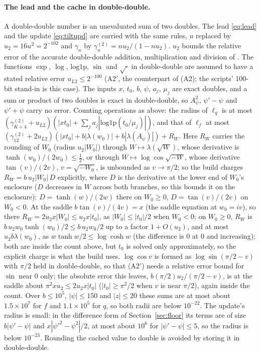 \paragraph{The lead and the cache in double-double.} A double-double number is an unevaluated sum of two doubles.
The lead \eqref{eq:lead} and the update \eqref{eq:tiltupd} are carried with the same rules, $u$ replaced by
$u_2=16u^2=2^{-102}$ and $\gamma_n$ by $\gamma^{(2)}_n=nu_2/(1-nu_2)$. $u_2$ bounds the relative error of the
accurate double-double addition, multiplication and division of \cite{jmp}. The functions $\exp$, $\log$,
$\mathrm{log1p}$, $\sin$ and $\sqrt{\cdot}$ in double-double are assumed to have a stated relative error
$u_{L2}\le2^{-100}$ (A2$'$, the counterpart of (A2); the scripts' 100-bit stand-in is this case). The inputs $x$,
$t_0$, $b$, $\psi$, $a_j$, $\mu_j$ are exact doubles, and a sum or product of two doubles is exact in
double-double, so $A_\psi^2$, $\psi'-\psi$ and $\psi'+\psi$ carry no error. Counting operations as above: the
radius of $\ell_q$ is at most $(\gamma^{(2)}_{K+4}+u_{L2})(|xt_0|+\sum_ja_j|\mathrm{log1p}(t_0/\mu_j)|)$, and that
of $\ell_f$ at most $(\gamma^{(2)}_{12}+2u_{L2})(|xt_0|+b|\lambda(w_0)|+b|\lambda(A_\psi)|)+R_W$. Here $R_W$ carries
the rounding of $W_0$ (radius $u_2|W_0|$) through $W\mapsto\lambda(\sqrt W)$, whose derivative is
$\tanh(w_0)/(2w_0)\le\frac12$, or through $W\mapsto\log\cos\sqrt{-W}$, whose derivative $\tan(v)/(2v)$, $v=\sqrt{-W_0}$,
is unbounded as $v\to\pi/2$; so the build charges $R_W=b\,u_2|W_0|\,D$ explicitly, where $D$ is the derivative
at the lower end of $W_0$'s enclosure ($D$ decreases in $W$ across both branches, so this bounds it on the
enclosure): $D=\tanh(w)/(2w)$ there on $W_0\ge0$, $D=\tan(v)/(2v)$ on $W_0<0$. At the saddle $b\tan(v)/(4v)=x$ (the
saddle equation at $w_0=iv$), so there $R_W=2u_2x|W_0|\le u_2x|t_0|$, as $|W_0|\le|t_0|/2$ when $W_0<0$; on
$W_0\ge0$, $R_W$ is $b\,u_2w_0\tanh(w_0)/2\le b\,u_2w_0/2$ up to a factor $1+O(u_2)$, and at most $u_2b\lambda(w_0)$, as
$w\tanh w/2\le\log\cosh w$ (the difference is 0 at 0 and increasing); both are inside the count above,
but $t_0$ is solved only approximately, so the explicit charge is what the build uses. $\log\cos v$ is formed as
$\log\sin(\pi/2-v)$ with $\pi/2$ held in double-double, so that (A2$'$) needs a relative error bound for $\sin$ near
0 only; the absolute error this leaves, $b(\pi/2)u_2/(\pi/2-v)$, is at the saddle about $\pi^2xu_2\le2u_2x|t_0|$
($|t_0|\ge\pi^2/2$ when $v$ is near $\pi/2$), again inside the count. Over $b\le10^5$, $|\psi|\le150$ and $|z|\le20$ these sums are at most
about $1.5\times10^7$ for $f$ and $1.1\times10^5$ for $q$, so both radii are below $10^{-22}$. The update's radius is
small: in the difference form of Section~\ref{sec:floor} its terms are of size $b|\psi'-\psi|$ and $x|\psi'^2-\psi^2|/2$, at most about $10^6$ for
$|\psi'-\psi|\le5$, so the radius is below $10^{-23}$. Rounding the cached value to double is avoided by storing
it in double-double.

